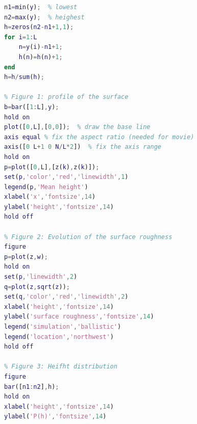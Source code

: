 \begin{lstlisting}[language=matlab]
% calculate the height distribution
n1=min(y);  % lowest
n2=max(y);  % heighest
h=zeros(n2-n1+1,1);
for i=1:L
    n=y(i)-n1+1;
    h(n)=h(n)+1;
end
h=h/sum(h);

% Figure 1: profile of the surface
b=bar([1:L],y);
hold on
plot([0,L],[0,0]);  % draw the base line
axis equal % fix the aspect ratio (needed for movie)
axis([0 L+1 0 N/L*2])  % fix the axis range
hold on
p=plot([0,L],[z(k),z(k)]);
set(p,'color','red','linewidth',1)
legend(p,'Mean height')
xlabel('x','fontsize',14)
ylabel('height','fontsize',14)
hold off

% Figure 2: Evolution of the surface roughness
figure  
p=plot(z,w);
hold on
set(p,'linewidth',2)
q=plot(z,sqrt(z));
set(q,'color','red','linewidth',2)
xlabel('height','fontsize',14)
ylabel('surface roughness','fontsize',14)
legend('simulation','ballistic')
legend('location','northwest')
hold off

% Figure 3: Heifht distribution
figure
bar([n1:n2],h);
hold on
xlabel('height','fontsize',14)
ylabel('P(h)','fontsize',14)
\end{lstlisting}
\normalsize


